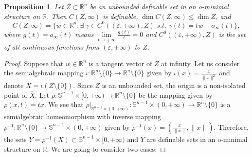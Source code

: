 \documentclass[a4paper,11pt]{amsart}
\newtheorem{proposition}[theorem]{Proposition}
\newcommand{\R}{\mathbb R}
\begin{document}
\begin{proposition}\label{selection_lemma}
Let $Z\subset \R^n$ be an unbounded definable set in an o-minimal structure on $\R$. Then $C(Z,\infty)$ is definable, $\dim C(Z,\infty)\leq \dim Z$, and 
$$
C(Z,\infty)=\{w\in \R^n; \exists\ \gamma\in C^0((\varepsilon ,+\infty ), Z) \,\,  s.t.\,\,\gamma(t)=tw+o_{\infty }(t)\},
$$ 
where $g(t)=o_{\infty }(t)$ means $\lim\limits _{t\to +\infty }\frac{g(t)}{t}=0$ and $C^0((\varepsilon ,+\infty ), Z)$ is the set of all continuous functions from $(\varepsilon ,+\infty )$ to $Z$. 
\end{proposition}
\begin{proof}
Suppose that $w\in\R^n$ is a tangent vector of $Z$ at infinity. Let us consider the semialgebraic mapping $\iota\colon\R^n\setminus\{0\}\to \R^n\setminus\{0\}$ given by $\iota(x)=\frac{x}{\|x\|^2}$ and denote $X=\iota(Z\setminus \{0\})$.  Since $Z$ is an unbounded set, the origin is a non-isolated point of $\overline{X}$. Let $\rho\colon \mathbb{S}^{n-1}\times [0,+\infty )\to \R^n\setminus \{0\}$ be the mapping given by $\rho(x,t)=tx$. We see that $\rho|_{\mathbb{S}^{n-1}\times (0,+\infty )}:\mathbb{S}^{n-1}\times (0,+\infty )\to \R^n\setminus \{0\}$ is a semialgebraic homeomorphism with inverse mapping $\rho^{-1}\colon\R^n\setminus \{0\}\to \mathbb{S}^{n-1}\times (0,+\infty )$ given by $\rho^{-1}(x)=(\frac{x}{\|x\|},\|x\|)$. Therefore, the sets $Y=\rho^{-1}(X)\subset \mathbb{S}^{n-1}\times [0,+\infty )$ and $\overline{Y}$ are definable sets in an o-minimal structure on $\R$. We are going to consider two cases:

\bigskip


\end{proof}
\end{document}
